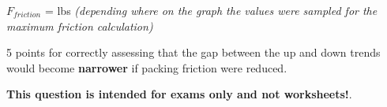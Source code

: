 \vskip 10pt

$F_{friction}$ =  lbs  {\it (depending where on the graph the values were sampled for the maximum friction calculation)}

\vskip 10pt

5 points for correctly assessing that the gap between the up and down trends would become {\bf narrower} if packing friction were reduced.







{\bf This question is intended for exams only and not worksheets!}.



